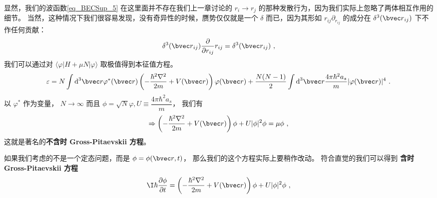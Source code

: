 显然，我们的波函数\autoref{eq_BECSup_5} 在这里面并不存在我们上一章讨论的 $r_i\to r_j$ 的那种发散行为，因为我们实际上忽略了两体相互作用的细节。 当然，这种情况下我们很容易发现，没有奇异性的时候，赝势仅仅就是一个 $\delta$ 而已，因为其形如 $r_{ij}\partial_{r_{ij}}$ 的成分在 $\delta^3({\bvec r}_{ij})$ 下不作任何贡献：
\begin{equation}
\delta^3({\bvec r}_{ij})\frac{\partial}{\partial r_{ij}}r_{ij} = \delta^3({\bvec r}_{ij})~,
\end{equation}
我们可以通过对 $\langle \varphi|H+\mu N|\varphi\rangle$ 取极值得到本征值方程。
\begin{equation}
\varepsilon = N\int \text{d}^3{\bvec r}\varphi^*({\bvec r})\left(-\frac{\hbar^2\nabla^2}{2m}+V({\bvec r})\right)\varphi({\bvec r})+\frac{N(N-1)}{2}\int \text{d}^3{\bvec r}\frac{4\pi\hbar^2a_s}{m}|\varphi({\bvec r})|^4~.
\end{equation}
以 $\varphi^*$ 作为变量， $N\to\infty$ 而且 $\phi = \sqrt{N}\varphi, U\equiv \dfrac{4\pi\hbar^2a_s}{m}$， 我们有
\begin{equation}
\Rightarrow \left(-\frac{\hbar^2\nabla^2}{2m}+V({\bvec r})\right)\phi + U|\phi|^2\phi = \mu\phi~,
\end{equation}
这就是著名的\textbf{不含时 Gross-Pitaevskii 方程}。

如果我们考虑的不是一个定态问题，而是 $\phi = \phi({\bvec r},t)$， 那么我们的这个方程实际上要稍作改动。 符合直觉的我们可以得到 \textbf{含时 Gross-Pitaevskii 方程}
\begin{equation}\label{eq_BECSup_10}
\I\hbar\frac{\partial\phi}{\partial t} = \left(-\frac{\hbar^2\nabla^2}{2m}+V({\bvec r})\right)\phi + U|\phi|^2\phi~,
\end{equation}


